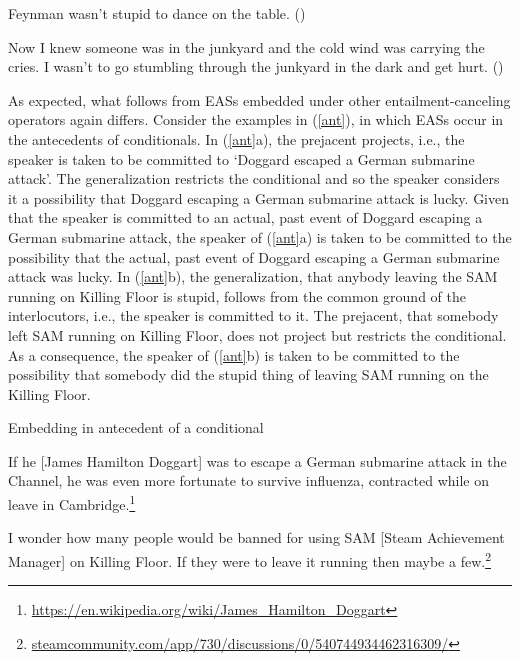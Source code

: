 \documentclass[11pt,fleqn]{article}
\newcommand{\6}{\mbox{$[\hspace*{-.6mm}[$}}
\newcommand{\9}{\mbox{$]\hspace*{-.6mm}]$}}
\begin{document}
\begin{exe}
 Feynman wasn't stupid to dance on the table. \hfill (\citealt[18f.]{barker02})

 Now I knew someone was in the junkyard and the cold wind was
carrying the cries. I wasn't  to go stumbling through the
junkyard in the dark and get hurt. \hfill (\citealt[235]{karttunen-etal2014})

\end{exe}

As expected, what follows from EASs embedded under other entailment-canceling operators again differs. Consider the examples in (\ref{ant}), in which EASs occur in the antecedents of conditionals. In (\ref{ant}a), the prejacent projects, i.e., the speaker is taken to be committed to `Doggard escaped a German submarine attack'. The generalization restricts the conditional and so the speaker considers it a possibility that Doggard escaping a German submarine attack is lucky. Given that the speaker is committed to an actual, past event of Doggard escaping a German submarine attack, the speaker of (\ref{ant}a) is taken to be committed to the possibility that the actual, past event of Doggard escaping a German submarine attack was lucky. In (\ref{ant}b), the generalization, that anybody leaving the SAM running on Killing Floor is stupid, follows from the common ground of the interlocutors, i.e., the speaker is committed to it. The prejacent, that somebody left SAM running on Killing Floor, does not project but restricts the conditional. As a consequence, the speaker of (\ref{ant}b) is taken to be committed to the possibility that somebody did the stupid thing of leaving SAM running on the Killing Floor.

\begin{exe}
\ex\label{ant} Embedding in antecedent of a conditional
\begin{xlist}

\ex If he [James Hamilton Doggart] was  to escape a German submarine attack in the Channel, he was even more fortunate to survive influenza, contracted while on leave in Cambridge.\footnote{\url{https://en.wikipedia.org/wiki/James_Hamilton_Doggart}}


\ex 
\begin{xlist}
 I wonder how many people would be banned for using SAM [Steam Achievement Manager] on Killing Floor.
 If they were  to leave it running then maybe a few.\footnote{\url{steamcommunity.com/app/730/discussions/0/540744934462316309/}}

\end{xlist} 
\end{xlist}
\end{exe}
\end{document}
